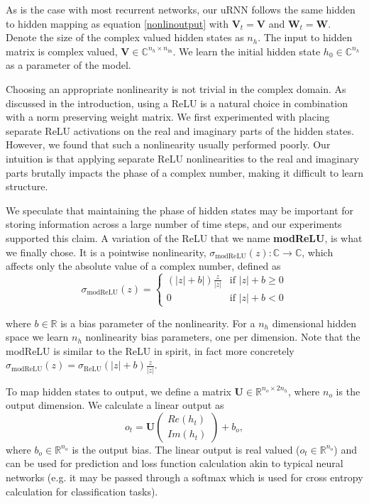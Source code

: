 \documentclass{article} %
\newcommand{\matr}[1]{\mathbf{#1}}
\newcommand\RR{\mathbb{R}}
\newcommand\CC{\mathbb{C}}
\begin{document}
As is the case with most recurrent networks, our uRNN follows the same hidden to hidden mapping as 
equation \ref{nonlinoutput} with $\matr{V}_t = \matr{V}$ and $\matr{W}_t = \matr{W}$. 
Denote the size of the complex valued hidden states as $n_h$.
The input to hidden matrix is complex valued, $\matr{V} \in \CC^{n_h \times n_\mathrm{in}}$. 
We learn the initial hidden state $h_0 \in \CC^{n_h}$ as a parameter of the model.

Choosing an appropriate nonlinearity is not trivial in the complex domain.
As discussed in the introduction, using a ReLU is a natural choice in combination with a norm preserving
weight matrix. We first experimented with placing separate ReLU activations on the real and imaginary
parts of the hidden states.
However, we found that such a nonlinearity usually performed poorly.
Our intuition is that applying separate ReLU nonlinearities to the real 
and imaginary parts brutally impacts the 
phase of a complex number, making it difficult to learn structure.

We speculate that maintaining the phase of hidden states may be important for storing information 
across a large number of time steps, and our experiments supported this claim.
A variation of the ReLU that we name {\bf modReLU}, is what we 
finally chose. It is a pointwise nonlinearity,  
$\sigma_\mathrm{modReLU} (z) : \CC \rightarrow \CC$, which
affects only the absolute value of a complex number, defined as 
\begin{equation} \sigma_\mathrm{modReLU} (z) = 
\left\{
  \begin{array}{ll}
    (|z|+b|) \frac{z}{|z|}  & \mbox{if } |z| + b \geq 0 \\
    0 & \mbox{if } |z| + b < 0
  \end{array}
\right.
\end{equation}

where $b \in \RR$ is a bias parameter of the nonlinearity. For a $n_h$ dimensional hidden space
we learn $n_h$ nonlinearity bias parameters, one per dimension. 
Note that the modReLU is similar to the ReLU in spirit, in fact more concretely
$\sigma_\mathrm{modReLU}(z) = \sigma_\mathrm{ReLU}(|z| + b) \frac{z}{|z|}$. 

To map hidden states to output, we define a matrix $\matr{U} \in \RR^{n_o \times 2n_h}$, 
where $n_o$ is the output dimension. We calculate a linear output as
\vspace{-0.5mm}
\begin{equation} o_t = \matr{U} \begin{pmatrix} Re(h_t) \\ Im(h_t) \end{pmatrix} + b_o , \end{equation}
\vspace{-0.25mm}
where $b_o \in \RR^{n_o}$ is the output bias. 
The linear output is real valued ($o_t \in \RR^{n_o}$) and can be used for prediction and loss function 
calculation akin to typical neural networks (e.g. it may be passed through a softmax which is used for 
cross entropy calculation for classification tasks).
\end{document}
